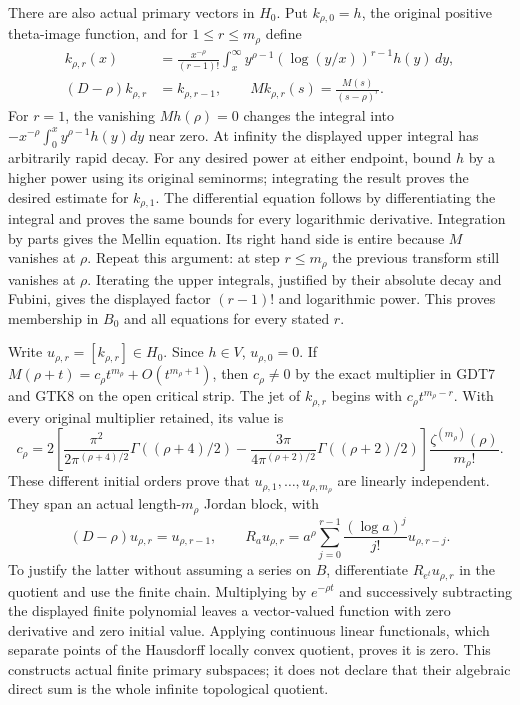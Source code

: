 There are also actual primary vectors in $H_0$.
Put $k_{\rho,0}=h$, the original positive theta-image
function, and for $1\le r\le m_\rho$ define
\begin{equation}\tag{GDT13}
 \begin{split}
 k_{\rho,r}(x)
 &=\frac{x^{-\rho}}{(r-1)!}
   \int_x^\infty y^{\rho-1}
             (\log(y/x))^{r-1}h(y)\,dy,\\
 (D-\rho)k_{\rho,r}&=k_{\rho,r-1},\qquad
 Mk_{\rho,r}(s)=\frac{M(s)}{(s-\rho)^r}.
 \end{split}
\end{equation}
For $r=1$, the vanishing $Mh(\rho)=0$ changes the
integral into $-x^{-\rho}\int_0^x y^{\rho-1}h(y)dy$
near zero. At infinity the displayed upper integral
has arbitrarily rapid decay. For any desired
power at either endpoint, bound $h$ by a higher
power using its original seminorms; integrating the
result proves the desired estimate for $k_{\rho,1}$.
The differential equation follows by differentiating
the integral and proves the same bounds for every
logarithmic derivative.
Integration by parts gives the Mellin equation.
Its right hand side is entire because $M$ vanishes
at $\rho$.
Repeat this argument: at step $r\le m_\rho$ the
previous transform still vanishes at $\rho$.
Iterating the upper integrals, justified by their
absolute decay and Fubini, gives the displayed
factor $(r-1)!$ and logarithmic power.
This proves membership in $B_0$ and all equations
for every stated $r$.

Write $u_{\rho,r}=[k_{\rho,r}]\in H_0$. Since $h\in V$,
$u_{\rho,0}=0$. If
$M(\rho+t)=c_\rho t^{m_\rho}+O(t^{m_\rho+1})$, then
$c_\rho\ne0$ by the exact multiplier in GDT7 and GTK8
on the open critical strip. The jet of $k_{\rho,r}$
begins with $c_\rho t^{m_\rho-r}$.
With every original multiplier retained, its value is
\[
 c_\rho=
 2\left[
 \frac{\pi^2}{2\pi^{(\rho+4)/2}}\Gamma((\rho+4)/2)
 -\frac{3\pi}{4\pi^{(\rho+2)/2}}\Gamma((\rho+2)/2)
 \right]\frac{\zeta^{(m_\rho)}(\rho)}{m_\rho!}.
\]
These different initial orders prove that
$u_{\rho,1},\ldots,u_{\rho,m_\rho}$ are linearly
independent. They span an actual length-$m_\rho$
Jordan block, with
\begin{equation}\tag{GDT14}
 (D-\rho)u_{\rho,r}=u_{\rho,r-1},\qquad
 R_a u_{\rho,r}
 =a^\rho\sum_{j=0}^{r-1}
          \frac{(\log a)^j}{j!}u_{\rho,r-j}.
\end{equation}
To justify the latter without assuming a series on $B$,
differentiate $R_{e^t}u_{\rho,r}$ in the quotient and
use the finite chain. Multiplying by
$e^{-\rho t}$ and successively subtracting the
displayed finite polynomial leaves a vector-valued
function with zero derivative and zero initial value.
Applying continuous linear functionals, which
separate points of the Hausdorff locally convex
quotient, proves it is zero.
This constructs actual finite primary subspaces;
it does not declare that their algebraic direct sum
is the whole infinite topological quotient.


